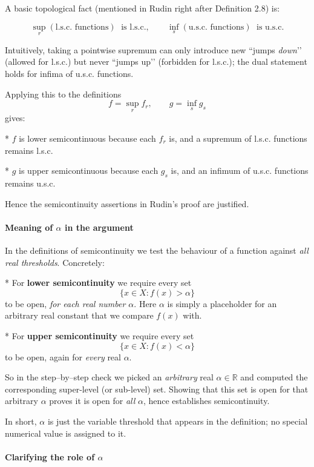 \documentclass[12pt]{article}
\theoremstyle{definition} %
\theoremstyle{plain} %
\begin{document}
A basic topological fact (mentioned in Rudin right after
Definition 2.8) is:

\[
  \sup_{r}(\text{l.s.c.\ functions})\;\text{ is l.s.c.},\qquad
  \inf_{s}(\text{u.s.c.\ functions})\;\text{ is u.s.c.}
\]

Intuitively, taking a pointwise supremum can only introduce new “jumps
\emph{down}’’ (allowed for l.s.c.) but never “jumps up’’
(forbidden for l.s.c.); the dual statement holds for infima of u.s.c.
functions.

Applying this to the definitions
\[
    f=\sup_{r} f_r, 
    \qquad
    g=\inf_{s} g_s 
    \tag{5}
\]
gives:

* \(f\) is lower semicontinuous because each \(f_r\) is,
  and a supremum of l.s.c. functions remains l.s.c.

* \(g\) is upper semicontinuous because each \(g_s\) is,
  and an infimum of u.s.c. functions remains u.s.c.

Hence the semicontinuity assertions in Rudin’s proof are justified.
\pagebreak
\paragraph{Meaning of $\alpha$ in the argument}

In the definitions of semicontinuity we test the behaviour of a function against \emph{all real thresholds}.  
Concretely:

* For \textbf{lower semicontinuity} we require every set
  \[
      \{x\in X : f(x)>\alpha\}
  \]
  to be open, \emph{for each real number $\alpha$}.  
  Here $\alpha$ is simply a placeholder for an arbitrary real constant that we compare $f(x)$ with.

* For \textbf{upper semicontinuity} we require every set
  \[
      \{x\in X : f(x)<\alpha\}
  \]
  to be open, again for \emph{every} real $\alpha$.

So in the step–by–step check we picked an \emph{arbitrary} real
$\alpha\in\mathbb{R}$ and computed the corresponding super-level (or
sub-level) set.  
Showing that this set is open for that arbitrary $\alpha$ proves it is
open for \emph{all} $\alpha$, hence establishes semicontinuity.

In short, $\alpha$ is just the variable threshold that appears in the
definition; no special numerical value is assigned to it.
\pagebreak

\paragraph{Clarifying the role of $\alpha$}
\end{document}
